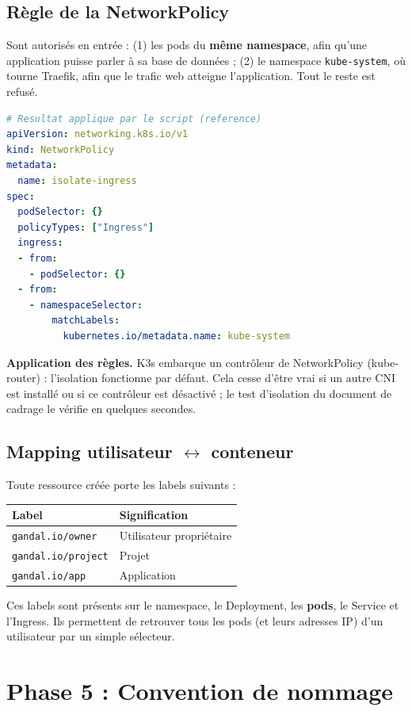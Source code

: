 \documentclass[12pt,a4paper]{article}
\begin{document}
\subsection{Règle de la NetworkPolicy}
Sont autorisés en entrée : (1) les pods du \textbf{même namespace}, afin qu'une application puisse parler à sa base de données ; (2) le namespace \texttt{kube-system}, où tourne Traefik, afin que le trafic web atteigne l'application. Tout le reste est refusé.

\begin{lstlisting}[language=yaml]
# Resultat applique par le script (reference)
apiVersion: networking.k8s.io/v1
kind: NetworkPolicy
metadata:
  name: isolate-ingress
spec:
  podSelector: {}
  policyTypes: ["Ingress"]
  ingress:
  - from:
    - podSelector: {}
  - from:
    - namespaceSelector:
        matchLabels:
          kubernetes.io/metadata.name: kube-system
\end{lstlisting}

\textbf{Application des règles.} K3s embarque un contrôleur de NetworkPolicy (kube-router) : l'isolation fonctionne par défaut. Cela cesse d'être vrai si un autre CNI est installé ou si ce contrôleur est désactivé ; le test d'isolation du document de cadrage le vérifie en quelques secondes.

\subsection{Mapping utilisateur $\leftrightarrow$ conteneur}
Toute ressource créée porte les labels suivants :
\begin{center}
\begin{tabular}{ll}
\toprule
\textbf{Label} & \textbf{Signification} \\
\midrule
\texttt{gandal.io/owner} & Utilisateur propriétaire \\
\texttt{gandal.io/project} & Projet \\
\texttt{gandal.io/app} & Application \\
\bottomrule
\end{tabular}
\end{center}
Ces labels sont présents sur le namespace, le Deployment, les \textbf{pods}, le Service et l'Ingress. Ils permettent de retrouver tous les pods (et leurs adresses IP) d'un utilisateur par un simple sélecteur.

\section{Phase 5 : Convention de nommage}
\end{document}

